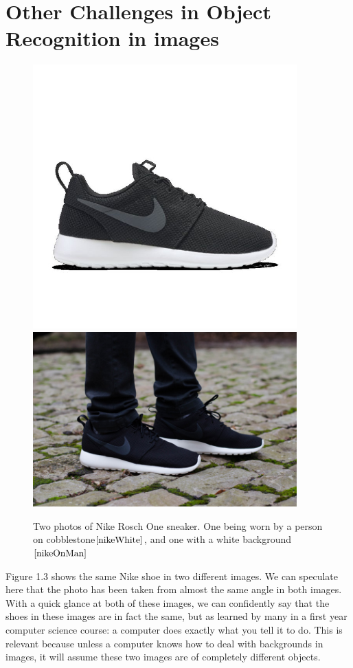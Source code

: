 \documentclass[12pt]{report} %
\begin{document}
\section{Other Challenges in Object Recognition in images}
\begin{figure}
\centering
\includegraphics[width=4in]{nike} 
\centering
\includegraphics[width=4in]{nike_on_man} 
\caption[Sneaker Images with Different Backgrounds]
	{Two photos of Nike Rosch One sneaker. One being worn by a person on cobblestone$\cite{nikeWhite}$, and one with a white background$\cite{nikeOnMan}$}
\end{figure}
	
	Figure 1.3 shows the same Nike shoe in two different images. We can speculate here that the photo has been taken from almost the same angle in both images. With a quick glance at both of these images, we can confidently say that the shoes in these images are in fact the same, but as learned by many in a first year computer science course: a computer does exactly what you tell it to do. This is relevant because unless a computer knows how to deal with backgrounds in images, it will assume these two images are of completely different objects. 
\end{document}
